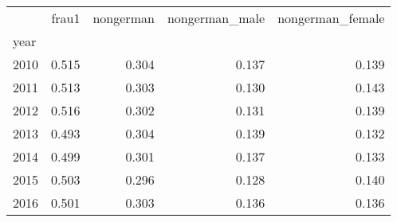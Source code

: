 \begin{tabular}{lrrrr}
\toprule
 & frau1 & nongerman & nongerman_male & nongerman_female \\
year &  &  &  &  \\
\midrule
2010 & 0.515 & 0.304 & 0.137 & 0.139 \\
2011 & 0.513 & 0.303 & 0.130 & 0.143 \\
2012 & 0.516 & 0.302 & 0.131 & 0.139 \\
2013 & 0.493 & 0.304 & 0.139 & 0.132 \\
2014 & 0.499 & 0.301 & 0.137 & 0.133 \\
2015 & 0.503 & 0.296 & 0.128 & 0.140 \\
2016 & 0.501 & 0.303 & 0.136 & 0.136 \\
\bottomrule
\end{tabular}
